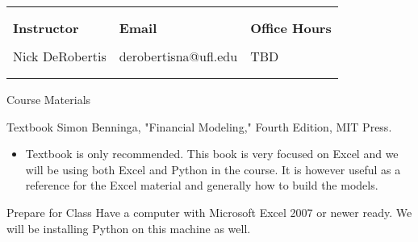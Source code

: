 \documentclass[11pt]{resume}
\begin{document}
\begin{tabular}{C{5.5cm}C{5.5cm}C{5.5cm}}
\toprule
\\

\\

\Large \textbf{Instructor} & \Large \textbf{Email} & \Large \textbf{Office Hours}\\

\\

Nick DeRobertis & derobertisna@ufl.edu & TBD\\

\\

\\

\end{tabular}
\begin{section}{Course Materials}
\begin{subsection}{Textbook}
Simon Benninga, "Financial Modeling," Fourth Edition, MIT Press.
\begin{itemize}
\item Textbook is only recommended. This book is very focused on Excel and we will be using both Excel
and Python in the course. It is however useful as a reference for the Excel material and generally how
to build the models.
\end{itemize}
\end{subsection}
\begin{subsection}{Prepare for Class}
Have a computer with Microsoft Excel 2007 or newer ready. We will be installing Python on this machine as well.
\end{subsection}
\end{section}
\vspace{0.5cm}
\end{document}
